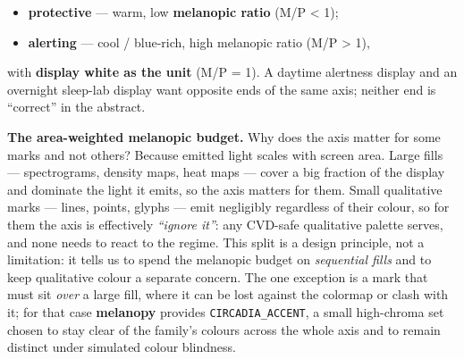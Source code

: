 \documentclass[10pt,a4paper,twocolumn]{article}
\begin{document}
\begin{itemize}
    \item \textbf{protective} --- warm, low \textbf{melanopic ratio} (M/P < 1);
    \item \textbf{alerting} --- cool / blue-rich, high melanopic ratio (M/P > 1),
\end{itemize}

with \textbf{display white as the unit} (M/P = 1).
A daytime alertness display and an overnight sleep-lab display want opposite ends of the same axis; neither end is ``correct'' in the abstract.

\par
\textbf{The area-weighted melanopic budget.} Why does the axis matter for some marks and not others?
Because emitted light scales with screen area. Large fills --- spectrograms, density maps, heat maps --- cover a big fraction of the display and dominate the light it emits, so the axis matters for them.
Small qualitative marks --- lines, points, glyphs --- emit negligibly regardless of their colour, so for them the axis is effectively \emph{``ignore it''}: any CVD-safe qualitative palette serves, and none needs to react to the regime.
This split is a design principle, not a limitation: it tells us to spend the melanopic budget on \emph{sequential fills} and to keep qualitative colour a separate concern.
The one exception is a mark that must sit \emph{over} a large fill, where it can be lost against the colormap or clash with it; for that case \textbf{melanopy} provides \texttt{CIRCADIA\_ACCENT}, a small high-chroma set chosen to stay clear of the family's colours across the whole axis and to remain distinct under simulated colour blindness.
\end{document}
